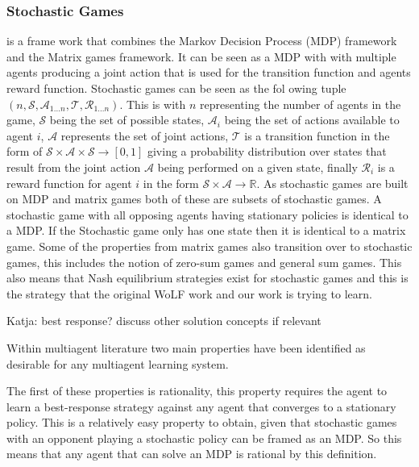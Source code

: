 \documentclass{article}
\newcommand\katja[1]{{\color{dark-cyan}Katja: #1}}
\begin{document}
\subsubsection{Stochastic Games} is a frame work that combines the Markov Decision Process (MDP) framework and the 
Matrix games framework. It can be seen as a MDP with with multiple agents producing 
a joint action that is used for the transition function and agents reward function. Stochastic games can be seen as the fol owing tuple $(n, \mathcal{S}, \mathcal{A}_{1...n}, 
\mathcal{T}, \mathcal{R}_{1...n})$. This is with $n$ representing the number of agents 
in the game, $\mathcal{S}$ being the set of possible states, $\mathcal{A}_{i}$ being the 
set of actions available to agent $i$, $\mathcal{A}$ represents the set of joint actions, 
$\mathcal{T}$ is a transition function in the form of 
$\mathcal{S}\times\mathcal{A}\times\mathcal{S}\rightarrow [0, 1]$ giving a probability 
distribution over states that result from the joint action $\mathcal{A}$ being performed
on a given state, finally $\mathcal{R}_{i}$ is a reward function for agent $i$ in the form
$\mathcal{S}\times\mathcal{A}\rightarrow \mathbb{R}$. As stochastic games are built on MDP and matrix games both of these are subsets of
stochastic games. A stochastic game with all opposing agents having stationary policies
is identical to a MDP. If the Stochastic game only has one state then it is identical 
to a matrix game. Some of the properties from matrix games also transition over to stochastic games, 
this includes the notion of zero-sum games and general sum games. This also means
that Nash equilibrium strategies exist for stochastic games and this is the strategy
that the original WoLF work and our work is trying to learn.

\katja{best response? discuss other solution concepts if relevant}


Within multiagent literature two main properties have
been identified as desirable for any multiagent learning
system.

The first of these properties is rationality, this property requires
the agent to learn a best-response strategy against any agent that 
converges to a stationary policy. This is a relatively easy property to 
obtain, given that stochastic games with an opponent playing a stochastic 
policy can be framed as an MDP. So this means that any agent that can 
solve an MDP is rational by this definition.
\end{document}
